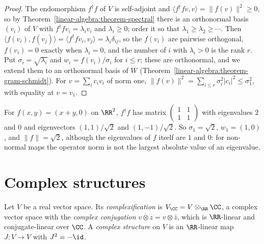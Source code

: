 \begin{proof}
The endomorphism $f^\dagger f$ of $V$ is self-adjoint and $\langle f^\dagger fv, v\rangle = \|f(v)\|^2 \geq 0$, so by Theorem~\ref{linear-algebra:theorem-spectral} there is an orthonormal basis $(v_i)$ of $V$ with $f^\dagger fv_i = \lambda_iv_i$
and $\lambda_i \geq 0$; order it so that $\lambda_1 \geq \lambda_2 \geq \cdots$. Then $\langle f(v_i), f(v_j)\rangle = \langle f^\dagger fv_i, v_j\rangle = \lambda_i\delta_{ij}$, so the $f(v_i)$ are pairwise orthogonal, $f(v_i) = 0$ exactly when
$\lambda_i = 0$, and the number of $i$ with $\lambda_i > 0$ is the rank $r$. Put $\sigma_i = \sqrt{\lambda_i}$ and $w_i = f(v_i)/\sigma_i$ for $i \leq r$; these are orthonormal, and we extend them to an orthonormal basis of
$W$ (Theorem~\ref{linear-algebra:theorem-gram-schmidt}). For $v = \sum_ic_iv_i$ of norm one, $\|f(v)\|^2 = \sum_{i \leq r}\sigma_i^2|c_i|^2 \leq \sigma_1^2$, with equality at $v = v_1$.
\end{proof}

\begin{example}\label{linear-algebra:example-svd}
For $f(x, y) = (x + y, 0)$ on $\RR^2$, $f^\dagger f$ has matrix $\begin{pmatrix}1 & 1\\ 1 & 1\end{pmatrix}$ with eigenvalues $2$ and $0$ and eigenvectors $(1, 1)/\sqrt2$ and $(1, -1)/\sqrt2$. So $\sigma_1 = \sqrt2$, $w_1 = (1, 0)$,
and $\|f\| = \sqrt2$, although the eigenvalues of $f$ itself are $1$ and $0$: for non-normal maps the operator norm is not the largest absolute value of an eigenvalue.
\end{example}

\section{Complex structures}\label{linear-algebra:section-complex-structures}

\begin{definition}\label{linear-algebra:definition-complex-structure}
Let $V$ be a real vector space. Its \emph{complexification} is $V_\CC = V \otimes_\RR \CC$, a complex vector space
with the \emph{complex conjugation} $\overline{v \otimes z} = v \otimes \bar z$, which is $\RR$-linear and
conjugate-linear over $\CC$. A \emph{complex structure} on $V$ is an $\RR$-linear map $J \colon V \to V$ with
$J^2 = -\id$.
\end{definition}

